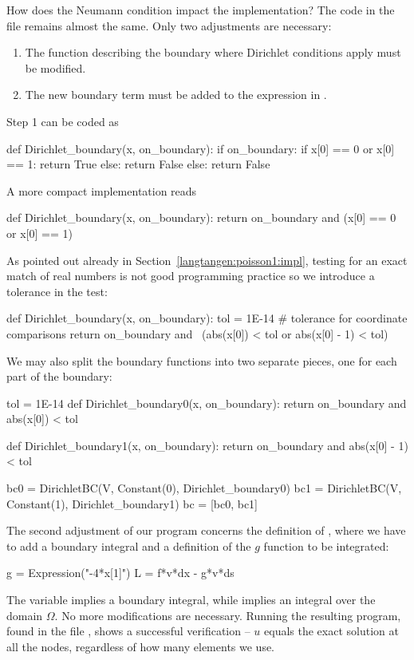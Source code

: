 How does the Neumann condition impact the implementation?
The code in the file  remains almost the same.
Only two adjustments are necessary:
\begin{enumerate}
\item The function describing the boundary where Dirichlet conditions
apply must be modified.
\item The new boundary term must be added to the expression in .
\end{enumerate}
Step 1 can be coded as
\begin{python}
def Dirichlet_boundary(x, on_boundary):
    if on_boundary:
        if x[0] == 0 or x[0] == 1:
            return True
        else:
            return False
    else:
        return False
\end{python}
A more compact implementation reads
\begin{python}
def Dirichlet_boundary(x, on_boundary):
    return on_boundary and (x[0] == 0 or x[0] == 1)
\end{python}
As pointed out already in Section~\ref{langtangen:poisson1:impl},
testing for an exact match of real numbers is not good programming
practice so we introduce a tolerance in the test:
\begin{python}
def Dirichlet_boundary(x, on_boundary):
    tol = 1E-14   # tolerance for coordinate comparisons
    return on_boundary and \
           (abs(x[0]) < tol or abs(x[0] - 1) < tol)
\end{python}
We may also split the boundary functions into two separate pieces, one
for each part of the boundary:
\begin{python}
tol = 1E-14
def Dirichlet_boundary0(x, on_boundary):
    return on_boundary and abs(x[0]) < tol

def Dirichlet_boundary1(x, on_boundary):
    return on_boundary and abs(x[0] - 1) < tol

bc0 = DirichletBC(V, Constant(0), Dirichlet_boundary0)
bc1 = DirichletBC(V, Constant(1), Dirichlet_boundary1)
bc = [bc0, bc1]
\end{python}

The second adjustment of our program concerns the definition of
, where we have to add a boundary
integral and a definition of the $g$ function to be integrated:
\begin{python}
g = Expression("-4*x[1]")
L = f*v*dx - g*v*ds
\end{python}
The  variable implies a boundary
integral, while   implies an integral
over the domain $\Omega$.  No more modifications are
necessary. Running the resulting program, found in the file
, shows a successful
verification -- $u$ equals the exact solution at all the nodes,
regardless of how many elements we use.

